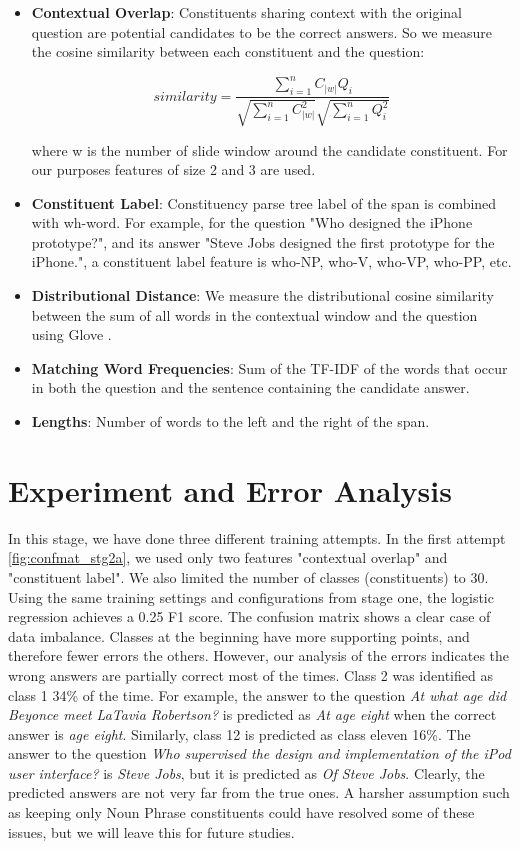 \begin{itemize}
\item \textbf{Contextual Overlap}: Constituents sharing context with the original question are potential candidates to be the correct answers. So we measure the cosine similarity between each constituent and the question:

$${ similarity } = \frac { \sum _ { i = 1 } ^ { n } C _ { |w| } Q _ { i } } { \sqrt { \sum _ { i = 1 } ^ { n } C _ { |w| } ^ { 2 } } \sqrt { \sum _ { i = 1 } ^ { n } Q _ { i } ^ { 2 } } }$$ 

where w is the number of slide window around the candidate constituent. For our purposes features of size 2 and 3 are used.


\item \textbf{Constituent Label}: Constituency parse tree label of the span is combined with wh-word. For example, for the question "Who designed the iPhone prototype?", and its answer "Steve Jobs designed the first prototype for the iPhone.", a constituent label feature is {who-NP, who-V, who-VP, who-PP, etc}. 
\item \textbf{Distributional Distance}: We measure the distributional cosine similarity between the sum of all words in the contextual window and the question using Glove \citep{pennington2014glove}.
\item \textbf{Matching Word Frequencies}: Sum of the TF-IDF of the words that occur in both the question and the sentence containing the candidate answer.
\item \textbf{Lengths}: Number of words to the left and the right of the span.
\end{itemize}

\section{Experiment and Error Analysis}
In this stage, we have done three different training attempts. 
In the first attempt \ref{fig:confmat_stg2a}, we used only two features "contextual overlap" and "constituent label". We also limited the number of classes (constituents) to 30. Using the same training settings and configurations from stage one, the logistic regression achieves a 0.25 F1 score. The confusion matrix shows a clear case of data imbalance. Classes at the beginning have more supporting points, and therefore fewer errors the others. However, our analysis of the errors indicates the wrong answers are partially correct most of the times. Class 2 was identified as class 1 34\% of the time. For example, the answer to the question \emph{At what age did Beyonce meet LaTavia Robertson? }is predicted as \emph{At age eight} when the correct answer is \emph{age eight}. Similarly, class 12 is predicted as class eleven 16\%. The answer to the question \emph{Who supervised the design and implementation of the iPod user interface?} is \emph{Steve Jobs}, but it is predicted as \emph{Of Steve Jobs}. Clearly, the predicted answers are not very far from the true ones. A harsher assumption such as keeping only Noun Phrase constituents could have resolved some of these issues, but we will leave this for future studies. 

